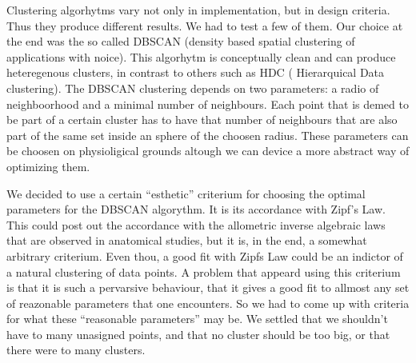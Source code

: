 Clustering algorhytms vary not only in implementation, but in design criteria.
Thus they produce different results. We had to test a few of them. Our choice at the
end was the so called DBSCAN (density based spatial clustering of applications with noice).
This algorhytm is conceptually clean and can produce heteregenous clusters, in contrast
to others such as HDC ( Hierarquical Data clustering). The DBSCAN clustering depends
on two parameters: a radio of neighboorhood and a minimal number of neighbours. Each
point that is demed to be part of a certain cluster has to have that number of neighbours
that are also part of the same set inside an sphere of the choosen radius. These
parameters can be choosen on physioligical grounds altough we can device a more
abstract way of optimizing them. 

We decided to use a certain ``esthetic'' criterium for choosing the optimal parameters
for the DBSCAN algorythm.  It is its accordance with Zipf's Law.  This could post out
the accordance with the allometric inverse algebraic laws that are observed in
anatomical studies, but it is, in the end, a somewhat arbitrary criterium. Even thou, a good
fit with Zipfs Law could be an indictor of a natural clustering of data points.
A problem that appeard using this criterium is that it is such a pervarsive
behaviour, that it gives a good fit to allmost any set of reazonable parameters
that one encounters. So we had to come up with criteria for what these ``reasonable
parameters'' may be.  We settled that we shouldn't have to many unasigned points, and
that no cluster should be too big, or that there were to many clusters. 
